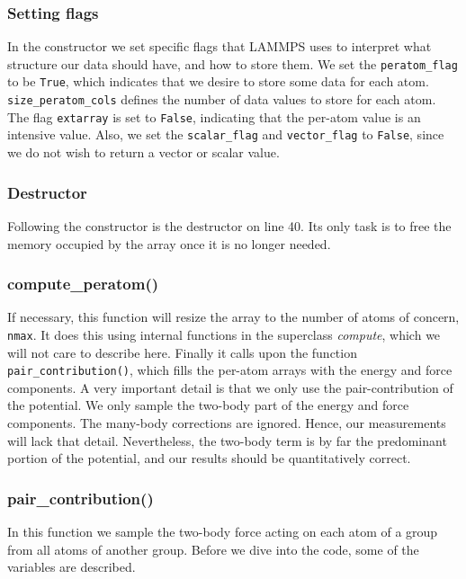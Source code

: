 \documentclass[twoside,english]{uiofysmaster}
\begin{document}


\subsubsection{Setting flags}
In the constructor we set specific flags that LAMMPS uses to interpret what structure our data should have, and how to store them. 
We set the \texttt{peratom\_flag} to be \texttt{True}, which indicates that we desire to store some data for each atom. 
\texttt{size\_peratom\_cols} defines the number of data values to store for each atom. 
The flag \texttt{extarray} is set to \texttt{False}, indicating that the per-atom value is an intensive value. 
Also, we set the \texttt{scalar\_flag} and \texttt{vector\_flag} to \texttt{False}, since we do not wish to return a vector or scalar value.

\subsubsection{Destructor}
Following the constructor is the destructor on line 40. Its only task is to free the memory occupied by the array once it is no longer needed.  

\subsubsection{compute\_peratom()}
 If necessary, this function will resize the array to the number of atoms of concern, \texttt{nmax}. 
 It does this using internal functions in the superclass \textit{compute}, which we will not care to describe here. 
 Finally it calls upon the function \texttt{pair\_contribution()}, which fills the per-atom arrays with the energy and force components. 
 A very important detail is that we only use the pair-contribution of the potential. 
 We only sample the two-body part of the energy and force components. 
The many-body corrections are ignored.
Hence, our measurements will lack that detail.
Nevertheless, the two-body term is by far the predominant portion of the potential, and our results should be quantitatively correct.  

\subsubsection{pair\_contribution()}
In this function we sample the two-body force acting on each atom of a group from all atoms of another group. 
Before we dive into the code, some of the variables are described.
\end{document}
